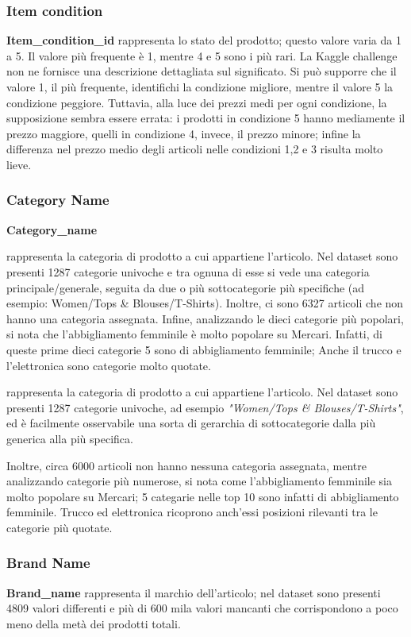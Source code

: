 
\subsubsection{Item condition}
\textbf{Item\_condition\_id} rappresenta lo stato del prodotto; questo valore
varia da 1 a 5. Il valore più frequente è 1, mentre 4 e 5 sono i più rari. La
Kaggle challenge non ne fornisce una descrizione dettagliata sul significato. Si
può supporre che il valore 1, il più frequente, identifichi la condizione
migliore, mentre il valore 5 la condizione peggiore. Tuttavia, alla luce dei
prezzi medi per ogni condizione, la supposizione sembra essere errata: i
prodotti in condizione 5 hanno mediamente il prezzo maggiore, quelli in
condizione 4, invece, il prezzo minore; infine la differenza nel prezzo medio
degli articoli nelle condizioni 1,2 e 3 risulta molto lieve.
\subsubsection{Category Name}
\textbf{Category\_name}

rappresenta la categoria di prodotto a cui appartiene l'articolo. Nel dataset
sono presenti 1287 categorie univoche e tra ognuna di esse si vede una categoria
principale/generale, seguita da due o più sottocategorie più specifiche (ad
esempio: Women/Tops \& Blouses/T-Shirts). Inoltre, ci sono 6327 articoli che non
hanno una categoria assegnata. Infine, analizzando le dieci categorie più
popolari, si nota che l'abbigliamento femminile è molto popolare su Mercari.
Infatti, di queste prime dieci categorie 5 sono di abbigliamento femminile;
Anche il trucco e l'elettronica sono categorie molto quotate.


rappresenta la categoria di prodotto a cui appartiene l'articolo. Nel dataset
sono presenti 1287 categorie univoche, ad esempio \textit{"Women/Tops \&
Blouses/T-Shirts"}, ed è facilmente osservabile una sorta di gerarchia di
sottocategorie dalla più generica alla più specifica.

Inoltre, circa 6000 articoli non hanno nessuna categoria assegnata, mentre analizzando categorie più numerose, si nota come l'abbigliamento
femminile sia molto popolare su Mercari; 5 categarie nelle top 10 sono infatti
di abbigliamento femminile. Trucco ed elettronica ricoprono anch'essi posizioni
rilevanti tra le categorie più quotate.
\subsubsection{Brand Name}
\textbf{Brand\_name} rappresenta il marchio dell'articolo; nel dataset sono
presenti 4809 valori differenti e più di 600 mila valori mancanti che
corrispondono a poco meno della metà dei prodotti totali.
